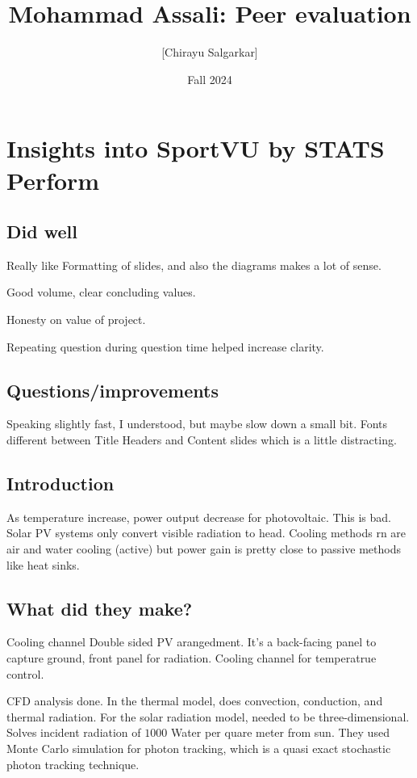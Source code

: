 \documentclass[10pt, oneside]{article}
\title{Mohammad Assali: Peer evaluation}
\author{[Chirayu Salgarkar]}
\date{Fall 2024}
\begin{document}
\maketitle
\tableofcontents

\vspace{.25in}

\section{Insights into SportVU by STATS Perform}

\subsection{Did well}
Really like Formatting of slides, and also the diagrams makes a lot of sense.

Good volume, clear concluding values. 

Honesty on value of project. 

Repeating question during question time helped increase clarity. 

\subsection{Questions/improvements}
Speaking slightly fast, I understood, but maybe slow down a small bit. Fonts different between Title Headers and Content slides which is a little distracting. 




\subsection{Introduction}
As temperature increase, power output decrease for photovoltaic. This is bad. Solar PV systems only convert visible radiation to head. Cooling methods rn are air and water cooling (active) but power gain is pretty close to passive methods like heat sinks. 

\subsection{What did they make?}
Cooling channel Double sided PV arangedment. It's a back-facing panel to capture ground, front panel for radiation. Cooling channel for temperatrue control. 

CFD analysis done. In the thermal model, does convection, conduction, and thermal radiation. For the solar radiation model, needed to be three-dimensional. Solves incident radiation of $1000$ Water per quare meter from sun. They used Monte Carlo simulation for photon tracking, which is a quasi exact stochastic photon tracking technique. 
\end{document}
